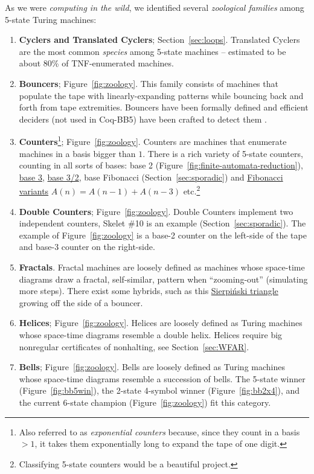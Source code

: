 \documentclass[a4paper,british]{article}
\theoremstyle{definition} %
\numberwithin{equation}{section}
\theoremstyle{definition} %
\newcommand{\CoqBB}{Coq-BB5\xspace}
\begin{document}
As we were \textit{computing in the wild}, we identified several \textit{zoological families} among 5-state Turing machines:

\begin{enumerate}
    \item \textbf{Cyclers and Translated Cyclers}; Section~\ref{sec:loops}. Translated Cyclers are the most common \textit{species} among 5-state machines -- estimated to be about 80\% of TNF-enumerated machines.
    \item \textbf{Bouncers}; Figure~\ref{fig:zoology}. This family consists of machines that populate the tape with linearly-expanding patterns while bouncing back and forth from tape extremities. Bouncers have been formally defined and efficient deciders (not used in \CoqBB) have been crafted to detect them \cite{bbchallenge_part1}.
    \item \textbf{Counters}\footnote{Also referred to as \textit{exponential counters} because, since they count in a basis $> 1$, it takes them exponentially long to expand the tape of one digit.}; Figure~\ref{fig:zoology}. Counters are machines that enumerate machines in a basis bigger than $1$. There is a rich variety of 5-state counters, counting in all sorts of bases: base 2 (Figure~\ref{fig:finite-automata-reduction}), \href{https://bbchallenge.org/1RB1RB_1RC0LD_1LD1RA_---1LE_0RA0LE }{base 3}, \href{https://bbchallenge.org/1LB1RC_0LE0RA_1LD1RA_0RA1LB_0RD0LB}{base 3/2}, base Fibonacci (Section~\ref{sec:sporadic}) and \href{https://bbchallenge.org/1RB1RA_0LC1LC_0RD1LD_0RA0LB}{Fibonacci variants} $A(n) = A(n-1) + A(n-3)$ etc.\footnote{Classifying 5-state counters would be a beautiful project.}
    \item \textbf{Double Counters}; Figure~\ref{fig:zoology}. Double Counters implement two independent counters, Skelet \#10 is an example (Section~\ref{sec:sporadic}). The example of Figure~\ref{fig:zoology} is a base-2 counter on the left-side of the tape and base-3 counter on the right-side.
    \item \textbf{Fractals}. Fractal machines are loosely defined as machines whose space-time diagrams draw a fractal, self-similar, pattern when ``zooming-out'' (\ie simulating more steps). There exist some hybrids, such as this \href{https://bbchallenge.org/1RB1RC_1RC1RB_1LD0RA_---1LE_0LD0LA&s=20000}{Sierpiński triangle} growing off the side of a bouncer.
    \item \textbf{Helices}; Figure~\ref{fig:zoology}. Helices are loosely defined as Turing machines whose space-time diagrams resemble a double helix. Helices require big nonregular certificates of nonhalting, see Section~\ref{sec:WFAR}.
    \item \textbf{Bells}; Figure~\ref{fig:zoology}. Bells are loosely defined as Turing machines whose space-time diagrams resemble a succession of bells. The 5-state winner (Figure~\ref{fig:bb5win}), the 2-state 4-symbol winner (Figure~\ref{fig:bb2x4}), and the current 6-state champion (Figure~\ref{fig:zoology}) fit this category.
\end{enumerate}
\end{document}
